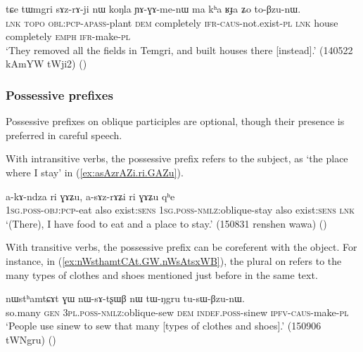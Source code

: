 \begin{exe}
\ex \label{ex:sAZrAji}
\gll  tɕe tɯmgri sɤz-rɤ-ji nɯ koŋla ɲɤ-ɣɤ-me-nɯ ma kʰa ʁɟa ʑo to-βzu-nɯ. \\
\textsc{lnk}  \textsc{topo} \textsc{obl}:\textsc{pcp}-\textsc{apass}-plant \textsc{dem} completely \textsc{ifr}-\textsc{caus}-not.exist-\textsc{pl} \textsc{lnk} house completely \textsc{emph} \textsc{ifr}-make-\textsc{pl} \\
\glt `They removed all the fields in Temgri, and built houses there [instead].' (140522 kAmYW tWji2) 	()
\end{exe}

 \subsubsection{Possessive prefixes} \label{sec:oblique.participle.possessive}
Possessive prefixes on oblique participles are optional, though their presence is preferred in careful speech.

With intransitive verbs, the possessive prefix refers to the subject, as  `the place where I stay' in (\ref{ex:asAzrAZi.ri.GAZu}).

\begin{exe}
\ex \label{ex:asAzrAZi.ri.GAZu}
\gll a-kɤ-ndza ri ɣɤʑu, a-sɤz-rɤʑi ri ɣɤʑu qʰe \\
\textsc{1sg}.\textsc{poss}-\textsc{obj}:\textsc{pcp}-eat also exist:\textsc{sens} \textsc{1sg}.\textsc{poss}-\textsc{nmlz}:oblique-stay also exist:\textsc{sens} \textsc{lnk} \\
\glt `(There), I have food to eat and a place to stay.' (150831 renshen wawa) ()
\end{exe}

With transitive verbs, the possessive prefix can be coreferent with the object. For instance, in (\ref{ex:nWsthamtCAt.GW.nWsAtsxWB}), the plural  on  refers to the many types of clothes and shoes mentioned just before in the same text.

 \begin{exe}
\ex \label{ex:nWsthamtCAt.GW.nWsAtsxWB}
\gll nɯstʰamtɕɤt ɣɯ nɯ-sɤ-tʂɯβ nɯ tɯ-ŋgru tu-sɯ-βzu-nɯ.   \\
so.many \textsc{gen} \textsc{3pl}.\textsc{poss}-\textsc{nmlz}:oblique-sew \textsc{dem} \textsc{indef}.\textsc{poss}-sinew \textsc{ipfv}-\textsc{caus}-make-\textsc{pl} \\
\glt `People use sinew to sew that many [types of clothes and shoes].' (150906 tWNgru) ()
\end{exe} 

